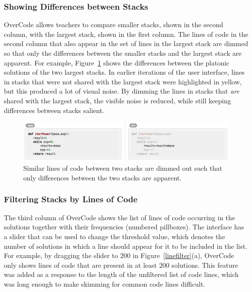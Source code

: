 \subsubsection{Showing Differences between Stacks} OverCode allows teachers to compare smaller stacks, shown in the second column, with the largest stack, shown in the first column. The lines of code in the second column that also appear in the set of lines in the largest stack are dimmed so that only the differences between the smaller stacks and the largest stack are apparent. For example, Figure~\ref{stackdifferences} shows the differences between the platonic solutions of the two largest stacks. In earlier iterations of the user interface, lines in stacks that were not shared with the largest stack were highlighted in yellow, but this produced a lot of visual noise. By dimming the lines in stacks that \textit{are} shared with the largest stack, the visible noise is reduced, while still keeping differences between stacks salient.

\begin{figure}
\centering
\includegraphics[scale=0.42]{Body/figures/overcode/lineFadingScreenshot}
\caption{Similar lines of code between two stacks are dimmed out such that only differences between the two stacks are apparent.}
\label{stackdifferences}
\end{figure}



\subsubsection{Filtering Stacks by Lines of Code} The third column of OverCode shows the list of lines of code occurring in the solutions together with their frequencies (numbered pillboxes). The interface has a slider that can be used to change the threshold value, which denotes the number of solutions in which a line should appear for it to be included in the list. For example, by dragging the slider to $200$ in Figure~\ref{linefilter}(a), OverCode only shows lines of code that are present in at least $200$ solutions. This feature was added as a response to the length of the unfiltered list of code lines, which was long enough to make skimming for common code lines difficult.

